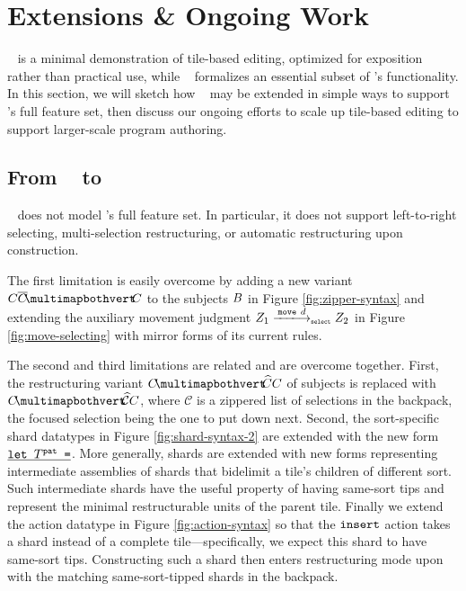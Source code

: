 \section{Extensions \& Ongoing Work}

\tylr~ is a minimal demonstration of tile-based
editing, optimized for exposition rather than practical use,
while \ty~ formalizes an essential subset of \tylr's functionality.
In this section, we will sketch how \ty~ may be extended
in simple ways to support \tylr's full feature set,
then discuss our ongoing efforts to scale up tile-based
editing to support larger-scale program authoring.

\subsection{From \ty~ to \tylr}

\ty~ does not model \tylr's full feature set.
In particular, it does not support left-to-right selecting,
multi-selection restructuring, or automatic restructuring
upon construction.

The first limitation is easily overcome by adding
a new variant $\selectingRight{\selection}{\selection}{\selection}$
to the subjects $B$ in Figure \ref{fig:zipper-syntax}
and extending the auxiliary movement judgment
$\smove{\editState_1}{\direction}{\editState_2}$
in Figure \ref{fig:move-selecting}
with mirror forms of its current rules.

The second and third limitations are related
and are overcome together.
First, the restructuring variant $\restructuring{\selection}{\selection}{\selection}$
of subjects is replaced with $\restructuring{\selection}{\mathcal{C}}\selection$,
where $\mathcal{C}$ is a zippered list of selections in the backpack,
the focused selection being the one to put down next.
Second, the sort-specific shard datatypes in Figure \ref{fig:shard-syntax-2}
are extended with
the new form $\underline{\texttt{$\texttt{let}~T^{\texttt{pat}}~\texttt{=}$}}$.
More generally, shards are extended with new forms
representing intermediate assemblies of shards that
bidelimit a tile's children of different sort.
Such intermediate shards have the useful property of having same-sort
tips and represent the minimal restructurable units of the
parent tile.
Finally we extend the action datatype in Figure \ref{fig:action-syntax}
so that the $\texttt{insert}$ action takes a shard instead of
a complete tile---specifically, we expect this shard to have same-sort tips.
Constructing such a shard then enters restructuring mode
upon with the matching same-sort-tipped shards in the backpack.


